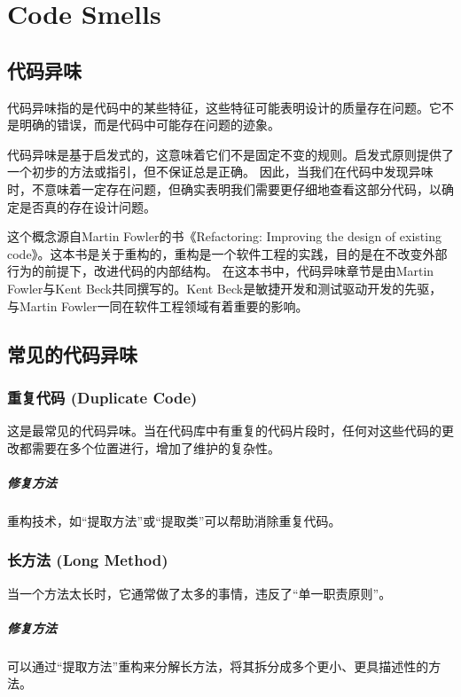 \chapter{Code Smells}

\section{代码异味}

代码异味指的是代码中的某些特征，这些特征可能表明设计的质量存在问题。它不是明确的错误，而是代码中可能存在问题的迹象。

代码异味是基于启发式的，这意味着它们不是固定不变的规则。启发式原则提供了一个初步的方法或指引，但不保证总是正确。
因此，当我们在代码中发现异味时，不意味着一定存在问题，但确实表明我们需要更仔细地查看这部分代码，以确定是否真的存在设计问题。

这个概念源自Martin Fowler的书《Refactoring: Improving the design of existing code》。这本书是关于重构的，重构是一个软件工程的实践，目的是在不改变外部行为的前提下，改进代码的内部结构。
在这本书中，代码异味章节是由Martin Fowler与Kent Beck共同撰写的。Kent Beck是敏捷开发和测试驱动开发的先驱，与Martin Fowler一同在软件工程领域有着重要的影响。

\section{常见的代码异味}

\subsection{重复代码 (Duplicate Code)}这是最常见的代码异味。当在代码库中有重复的代码片段时，任何对这些代码的更改都需要在多个位置进行，增加了维护的复杂性。
\paragraph{修复方法}重构技术，如“提取方法”或“提取类”可以帮助消除重复代码。

\subsection{长方法 (Long Method)}当一个方法太长时，它通常做了太多的事情，违反了“单一职责原则”。
\paragraph{修复方法}可以通过“提取方法”重构来分解长方法，将其拆分成多个更小、更具描述性的方法。

